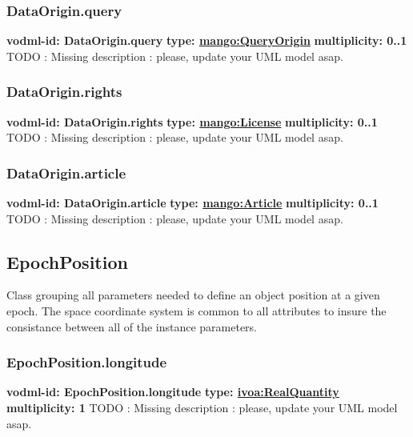     \subsubsection{DataOrigin.query}
      \textbf{vodml-id: DataOrigin.query} \newline
      \textbf{type: \hyperref[sect:QueryOrigin]{mango:QueryOrigin}} \newline
      \textbf{multiplicity: 0..1} \newline 
      TODO : Missing description : please, update your UML model asap.

    \subsubsection{DataOrigin.rights}
      \textbf{vodml-id: DataOrigin.rights} \newline
      \textbf{type: \hyperref[sect:License]{mango:License}} \newline
      \textbf{multiplicity: 0..1} \newline 
      TODO : Missing description : please, update your UML model asap.

    \subsubsection{DataOrigin.article}
      \textbf{vodml-id: DataOrigin.article} \newline
      \textbf{type: \hyperref[sect:Article]{mango:Article}} \newline
      \textbf{multiplicity: 0..1} \newline 
      TODO : Missing description : please, update your UML model asap.

  \subsection{EpochPosition}
  \label{sect:EpochPosition}
    Class grouping all parameters needed to define an object position at a given epoch. The space coordinate system is common to all attributes to insure the consistance between all of the instance parameters.

    \subsubsection{EpochPosition.longitude}
      \textbf{vodml-id: EpochPosition.longitude} \newline
      \textbf{type: \hyperref[sect:ivoa]{ivoa:RealQuantity}} \newline
      \textbf{multiplicity: 1} \newline 
      TODO : Missing description : please, update your UML model asap.


